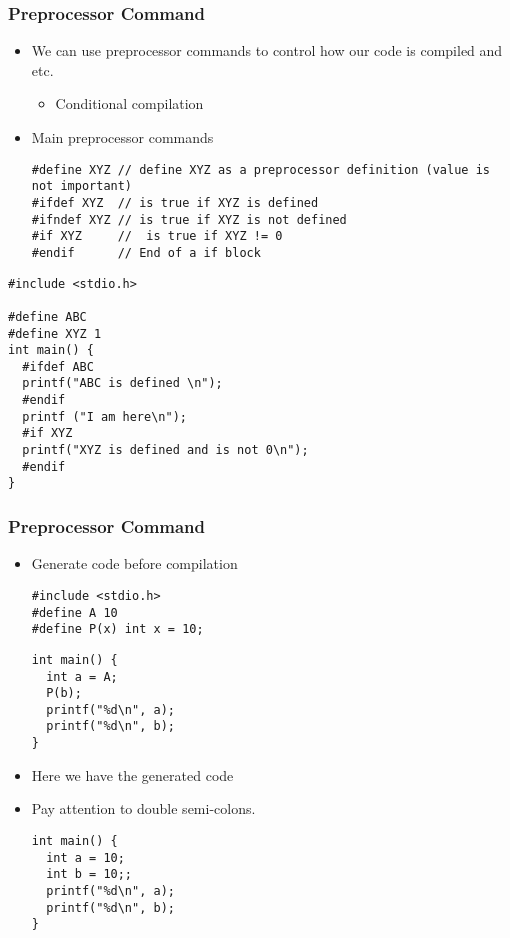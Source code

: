 \documentclass{../c-lecture}
\begin{document}
\begin{frame}[fragile]
  \frametitle{Preprocessor Command}
  \begin{itemize}
    \item
      We can use preprocessor commands to control how our code is compiled and
      etc.
    \begin{itemize}
      \item Conditional compilation
    \end{itemize}
    \item Main preprocessor commands
    \begin{verbatim}
#define XYZ // define XYZ as a preprocessor definition (value is not important)
#ifdef XYZ  // is true if XYZ is defined
#ifndef XYZ // is true if XYZ is not defined
#if XYZ     //  is true if XYZ != 0
#endif      // End of a if block
    \end{verbatim}
  \end{itemize}
\end{frame}

\begin{frame}[fragile]
  \begin{verbatim}
#include <stdio.h>

#define ABC
#define XYZ 1
int main() {
  #ifdef ABC
  printf("ABC is defined \n");
  #endif
  printf ("I am here\n");
  #if XYZ
  printf("XYZ is defined and is not 0\n");
  #endif
}
  \end{verbatim}
\end{frame}

\begin{frame}[fragile]
  \frametitle{Preprocessor Command}
  \begin{itemize}
    \item Generate code before compilation
    \begin{verbatim}
#include <stdio.h>
#define A 10
#define P(x) int x = 10;
    \end{verbatim}
    \begin{verbatim}
int main() {
  int a = A;
  P(b);
  printf("%d\n", a);
  printf("%d\n", b);
}
    \end{verbatim}
  \end{itemize}
\end{frame}

\begin{frame}[fragile]
  \begin{itemize}
    \item Here we have the generated code
    \item Pay attention to double semi-colons.
    \begin{verbatim}
int main() {
  int a = 10;
  int b = 10;;
  printf("%d\n", a);
  printf("%d\n", b);
}
    \end{verbatim}
  \end{itemize}
\end{frame}
\end{document}
